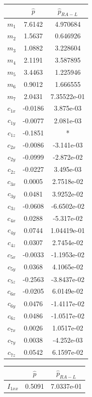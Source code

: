 \documentclass{article}
\begin{document}
\begin{table}
\begin{center}
\begin{tabular}{|c|cc|}
\hline
& $\hat{p}$ & $\hat{p}_{RA-L}$\\ 
\hline
$ m_1 $ & 7.6142 & 4.970684\\
$ m_2 $ & 1.5637 & 0.646926\\
$ m_3 $ & 1.0882 & 3.228604\\
$ m_4 $ & 2.1191 & 3.587895\\
$ m_5 $ & 3.4463 & 1.225946\\
$ m_6 $ & 0.9012 & 1.666555\\
$ m_7 $ & 2.0431 & 7.35522e-01\\
$ c_{1x} $ & -0.0186 & 3.875e-03\\
$ c_{1y} $ & -0.0077 & 2.081e-03\\
$ c_{1z} $ & -0.1851 & *\\
$ c_{2x} $ & -0.0086 & -3.141e-03\\
$ c_{2y} $ & -0.0999 & -2.872e-02\\
$ c_{2z} $ & -0.0227 & 3.495e-03\\
$ c_{3x} $ & 0.0005 & 2.7518e-02\\
$ c_{3y} $ & 0.0481 & 3.9252e-02\\
$ c_{3z} $ & -0.0608 & -6.6502e-02\\
$ c_{4x} $ & 0.0288 & -5.317e-02\\
$ c_{4y} $ & 0.0744 & 1.04419e-01\\
$ c_{4z} $ & 0.0307 & 2.7454e-02\\
$ c_{5x} $ & -0.0033 & -1.1953e-02\\
$ c_{5y} $ & 0.0368 & 4.1065e-02\\
$ c_{5z} $ & -0.2563 & -3.8437e-02\\
$ c_{6x} $ & -0.0205 & 6.0149e-02\\
$ c_{6y} $ & 0.0476 & -1.4117e-02\\
$ c_{6z} $ & 0.0486 & -1.0517e-02\\
$ c_{7x} $ & 0.0026 & 1.0517e-02\\
$ c_{7y} $ & 0.0038 & -4.252e-03\\
$ c_{7z} $ & 0.0542 & 6.1597e-02\\
\hline
\end{tabular}
\hspace{1cm}
\begin{tabular}{|c|cc|}
\hline
& $\hat{p}$ & $\hat{p}_{RA-L}$\\ 
\hline
$ I_{1xx} $ & 0.5091 & 7.0337e-01\\

\end{tabular}
\end{center}
\end{table}
\end{document}
